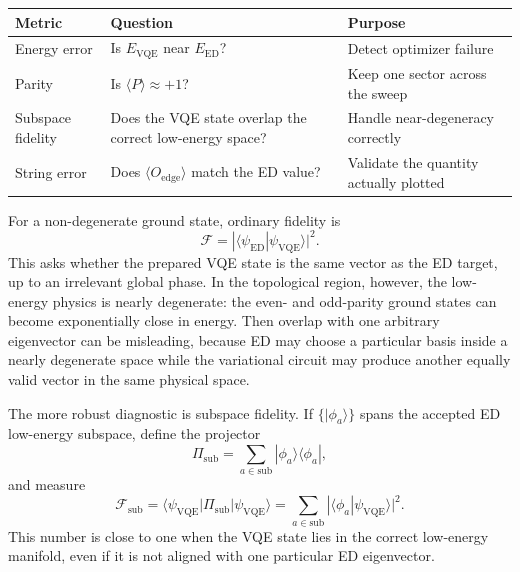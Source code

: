 \documentclass[11pt]{article}
\newcommand{\ket}[1]{|#1\rangle}
\newcommand{\bra}[1]{\langle#1|}
\begin{document}
\begin{center}
\begin{tabular}{p{}p{}p{}}
\toprule
\textbf{Metric} & \textbf{Question} & \textbf{Purpose} \\
\midrule
Energy error & Is $E_{\mathrm{VQE}}$ near $E_{\mathrm{ED}}$? & Detect optimizer failure \\
Parity & Is $\langle P\rangle\approx +1$? & Keep one sector across the sweep \\
Subspace fidelity & Does the VQE state overlap the correct low-energy space? & Handle near-degeneracy correctly \\
String error & Does $\langle O_{\mathrm{edge}}\rangle$ match the ED value? & Validate the quantity actually plotted \\
\bottomrule
\end{tabular}
\end{center}

For a non-degenerate ground state, ordinary fidelity is
\begin{equation}
  \mathcal{F}=|\langle\psi_{\mathrm{ED}}|\psi_{\mathrm{VQE}}\rangle|^2.
\end{equation}
This asks whether the prepared VQE state is the same vector as the ED target, up to an irrelevant global phase. In the topological region, however, the low-energy physics is nearly degenerate: the even- and odd-parity ground states can become exponentially close in energy. Then overlap with one arbitrary eigenvector can be misleading, because ED may choose a particular basis inside a nearly degenerate space while the variational circuit may produce another equally valid vector in the same physical space.

The more robust diagnostic is subspace fidelity. If $\{\ket{\phi_a}\}$ spans the accepted ED low-energy subspace, define the projector
\begin{equation}
  \Pi_{\mathrm{sub}}=\sum_{a\in\mathrm{sub}}\ket{\phi_a}\bra{\phi_a},
\end{equation}
and measure
\begin{equation}
  \mathcal{F}_{\mathrm{sub}}
  =\langle\psi_{\mathrm{VQE}}|\Pi_{\mathrm{sub}}|\psi_{\mathrm{VQE}}\rangle
  =\sum_{a\in\mathrm{sub}}|\langle\phi_a|\psi_{\mathrm{VQE}}\rangle|^2.
\end{equation}
This number is close to one when the VQE state lies in the correct low-energy manifold, even if it is not aligned with one particular ED eigenvector.
\end{document}

